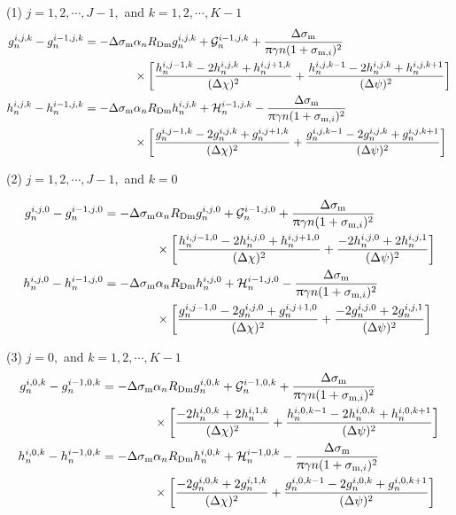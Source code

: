 \documentclass{article}
\begin{document}
(1) $j = 1,2,\cdots,J-1,$ and $k = 1,2,\cdots,K-1$
\begin{align}
	g_n^{i,j,k}-g_n^{i-1,j,k} = - \Delta\sigma_\text{m}&\alpha_n R_\text{Dm} g_n^{i,j,k}
	+\mathcal{G}_n^{i-1,j,k}
	+\frac{\Delta\sigma_{\mathrm{m}}}{\uppi \gamma n(1+\sigma_{\mathrm{m},i})^2} \nonumber\\
	&\times\qty[\frac{h_n^{i,j-1,k}-2h_n^{i,j,k}+h_n^{i,j+1,k}}{(\Delta \chi)^2}
	+ \frac{h_n^{i,j,k-1} - 2h_n^{i,j,k} +h_n^{i,j,k+1}}{(\Delta \psi)^2}]\\
	h_n^{i,j,k}-h_n^{i-1,j,k} = - \Delta\sigma_\text{m}&\alpha_n R_\text{Dm} h_n^{i,j,k}
	+\mathcal{H}_n^{i-1,j,k}
	-\frac{\Delta\sigma_\text{m}}{\uppi \gamma n(1+\sigma_{\mathrm{m},i})^2} \nonumber\\
	&\times\qty[\frac{g_n^{i,j-1,k}-2g_n^{i,j,k}+g_n^{i,j+1,k}}{(\Delta \chi)^2}
	+ \frac{g_n^{i,j,k-1} - 2g_n^{i,j,k} +g_n^{i,j,k+1}}{(\Delta \psi)^2}]
\end{align}

(2) $j = 1,2,\cdots,J-1,$ and $k = 0$

\begin{align}
	g_n^{i,j,0}-g_n^{i-1,j,0} = - \Delta\sigma_\text{m}&\alpha_n R_\text{Dm} g_n^{i,j,0}
	+\mathcal{G}_n^{i-1,j,0}
	+\frac{\Delta\sigma_{\mathrm{m}}}{\uppi \gamma n(1+\sigma_{\mathrm{m},i})^2} \nonumber\\
	&\times\qty[\frac{h_n^{i,j-1,0}-2h_n^{i,j,0}+h_n^{i,j+1,0}}{(\Delta \chi)^2}
	+ \frac{-2h_n^{i,j,0} + 2h_n^{i,j,1} }{(\Delta \psi)^2}]\\
	h_n^{i,j,0}-h_n^{i-1,j,0} = - \Delta\sigma_\text{m}&\alpha_n R_\text{Dm} h_n^{i,j,0}
	+\mathcal{H}_n^{i-1,j,0}
	-\frac{\Delta\sigma_{\mathrm{m}}}{\uppi \gamma n(1+\sigma_{\mathrm{m},i})^2} \nonumber\\
	&\times\qty[\frac{g_n^{i,j-1,0}-2g_n^{i,j,0}+g_n^{i,j+1,0}}{(\Delta \chi)^2}
	+ \frac{-2g_n^{i,j,0} + 2g_n^{i,j,1} }{(\Delta \psi)^2}]
\end{align}

(3) $j = 0,$ and $k = 1,2,\cdots,K-1$
\begin{align}
	g_n^{i,0,k}-g_n^{i-1,0,k} = - \Delta\sigma_\text{m}&\alpha_n R_\text{Dm} g_n^{i,0,k}
	+\mathcal{G}_n^{i-1,0,k}
	+\frac{\Delta\sigma_{\mathrm{m}}}{\uppi \gamma n(1+\sigma_{\mathrm{m},i})^2} \nonumber\\
	&\times\qty[\frac{-2h_n^{i,0,k}+2h_n^{i,1,k}}{(\Delta \chi)^2}
	+ \frac{h_n^{i,0,k-1} - 2h_n^{i,0,k} +h_n^{i,0,k+1}}{(\Delta \psi)^2}]\\
	h_n^{i,0,k}-h_n^{i-1,0,k} = - \Delta\sigma_\text{m}&\alpha_n R_\text{Dm} h_n^{i,0,k}
	+\mathcal{H}_n^{i-1,0,k}
	-\frac{\Delta\sigma_\text{m}}{\uppi \gamma n(1+\sigma_{\mathrm{m},i})^2} \nonumber\\
	&\times\qty[\frac{-2g_n^{i,0,k}+2g_n^{i,1,k}}{(\Delta \chi)^2}
	+ \frac{g_n^{i,0,k-1} - 2g_n^{i,0,k} +g_n^{i,0,k+1}}{(\Delta \psi)^2}]
\end{align}
\end{document}
